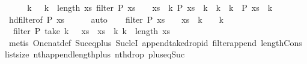 \begin{isabellebody}
\ \ \isamarkupfalse%
\ \isamarkupfalse%
\ k{}{\isacharprime}\ \ {\isacharasterisk}{\isacharcolon}\ {\isachardoublequoteopen}k{}{\isacharprime}\ {\isacharless}\ length\ {\isacharquery}xs{\isachardoublequoteclose}\ {\isachardoublequoteopen}filter\ P\ {\isacharquery}xs\ {\isacharbang}\ {}\ {\isacharequal}\ {\isacharquery}xs\ {\isacharbang}\ k{}{\isacharprime}{\isachardoublequoteclose}\ {\isachardoublequoteopen}P\ {\isacharparenleft}{\isacharquery}xs\ {\isacharbang}\ k{}{\isacharprime}{\isacharparenright}{\isachardoublequoteclose}\ {\isachardoublequoteopen}{\isasymforall}\ k{\isacharprime}\ {\isacharless}\ k{}{\isacharprime}{\isachardot}\ {\isasymnot}\ P\ {\isacharparenleft}{\isacharquery}xs\ {\isacharbang}\ k{\isacharprime}{\isacharparenright}{\isachardoublequoteclose}\isanewline
\ \ \ \ \isamarkupfalse%
\ hd{\isacharunderscore}filter{\isacharbrackleft}of\ P\ {\isacharquery}xs{\isacharbrackright}\isanewline
\ \ \ \ \isamarkupfalse%
\ auto\isanewline
\ \ \isamarkupfalse%
\ {\isachardoublequoteopen}filter\ P\ xs\ {\isacharbang}\ {}\ {\isacharequal}\ xs\ {\isacharbang}\ {\isacharparenleft}k{}\ {\isacharplus}\ {}\ {\isacharplus}\ k{}{\isacharprime}{\isacharparenright}{\isachardoublequoteclose}\isanewline
\ \ \ \ \isamarkupfalse%
\ {\isacharasterisk}\ {\isacharbackquoteopen}filter\ P\ {\isacharparenleft}take\ {\isacharparenleft}k{}\ {\isacharplus}\ {}{\isacharparenright}\ xs{\isacharparenright}\ {\isacharequal}\ {\isacharbrackleft}xs\ {\isacharbang}\ k{}{\isacharbrackright}{\isacharbackquoteclose}\ {\isacartoucheopen}k{}\ {\isacharless}\ length\ xs{\isacartoucheclose}\isanewline
\ \ \ \ \isamarkupfalse%
\ {\isacharparenleft}metis\ One{\isacharunderscore}nat{\isacharunderscore}def\ Suc{\isacharunderscore}eq{\isacharunderscore}plus{}\ Suc{\isacharunderscore}leI\ append{\isacharunderscore}take{\isacharunderscore}drop{\isacharunderscore}id\ filter{\isacharunderscore}append\ length{\isacharunderscore}Cons\ list{\isachardot}size{\isacharparenleft}{}{\isacharparenright}\ nth{\isacharunderscore}append{\isacharunderscore}length{\isacharunderscore}plus\ nth{\isacharunderscore}drop\ plus{\isacharunderscore}{}{\isacharunderscore}eq{\isacharunderscore}Suc{\isacharparenright}\isanewline
\ \ \isamarkupfalse%
\isanewline
\ \ \isamarkupfalse%

\end{isabellebody}

